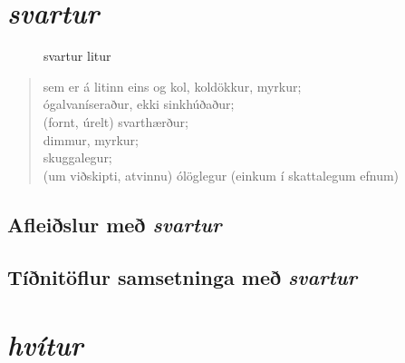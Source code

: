 \documentclass[12pt,b5paper,twosided,openright]{book}
\begin{document}
\begingroup
\renewcommand{\cleardoublepage}{}
\renewcommand{\clearpage}{}
	\tableofcontents
	\listoftables
	\listoffigures
\endgroup

\chapter{\textit{svartur}}
\label{kafli:svartur}

\begin{figure}[H]
\begin{tcolorbox}
	\centering
\end{tcolorbox}
	\caption{svartur litur}
	\label{mynd:svartur}
\end{figure}

\begin{quote}
	sem er á litinn eins og kol, koldökkur, myrkur; \\
	ógalvaníseraður, ekki sinkhúðaður; \\
	(fornt, úrelt) svarthærður;  \\
	dimmur, myrkur; \\
	skuggalegur; \\
	(um viðskipti, atvinnu) ólöglegur (einkum í skattalegum efnum)
\end{quote}

\section{Afleiðslur með \textit{svartur}}
\label{afl:svartafl}


\section{Tíðnitöflur samsetninga með \textit{svartur}}
\label{tidni:svartid}


\chapter{\textit{hvítur}}
\label{kafli:hvitur}
\end{document}
